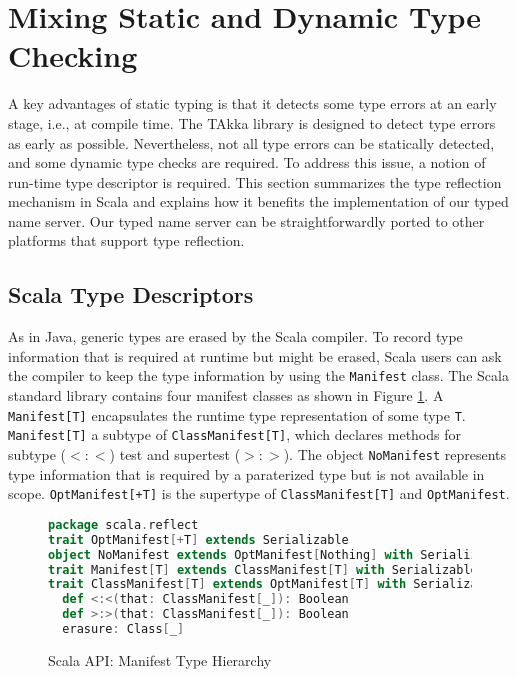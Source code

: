 \section{Mixing Static and Dynamic Type Checking}
\label{type_checking}
A key advantages of static typing is that it detects some type errors at an 
early stage, i.e., at compile time.  The TAkka library is designed to detect 
type errors as early as possible.  Nevertheless, not all type errors can be 
statically detected, and some dynamic type checks are required. To address this 
issue, a notion of run-time type descriptor is required.  This section 
summarizes the type reflection mechanism in Scala and  explains
how it benefits the implementation of our typed name
server.  Our typed name server can be straightforwardly ported
to other platforms that support type reflection.

\subsection{Scala Type Descriptors}

As in Java, generic types are erased by the Scala compiler.
To record type information that is required at runtime but might be
erased, Scala users can ask the compiler to keep the type information
by using the {\tt Manifest} class. The Scala standard library contains four
manifest classes as shown in Figure \ref{scala_api_manifest}.
A {\tt Manifest[T]} encapsulates the runtime type representation 
of some type {\tt T}.   {\tt Manifest[T]} a subtype of {\tt ClassManifest[T]}, 
which declares methods for subtype ($<:<$) test and supertest ($>:>$).  
The object {\tt NoManifest} represents type information that is required
by a paraterized type but is not available in scope.  {\tt OptManifest[+T]} is 
the supertype of {\tt ClassManifest[T]} and {\tt OptManifest}.

\begin{figure}[!h]
\begin{lstlisting}[language=scala, escapechar=?]
package scala.reflect
trait OptManifest[+T] extends Serializable
object NoManifest extends OptManifest[Nothing] with Serializable
trait Manifest[T] extends ClassManifest[T] with Serializable
trait ClassManifest[T] extends OptManifest[T] with Serializable
  def <:<(that: ClassManifest[_]): Boolean
  def >:>(that: ClassManifest[_]): Boolean
  erasure: Class[_]
\end{lstlisting}
\caption{Scala API: Manifest Type Hierarchy}
\label{scala_api_manifest}
\end{figure}

